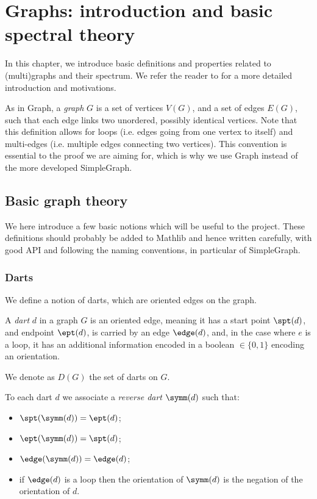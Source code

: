 
\chapter{Graphs: introduction and basic spectral theory}

In this chapter, we introduce basic definitions and properties
related to (multi)graphs and their spectrum.
We refer the reader to \cite{chung1992} for a more detailed introduction and motivations.

As in Graph, a \emph{graph} $G$ is a set of vertices $V(G)$, and
a set of edges $E(G)$, such that each edge links two unordered, possibly identical vertices.
Note that this definition allows for loops (i.e. edges going from one vertex to itself) and
multi-edges (i.e. multiple edges connecting two vertices). This convention is essential to the proof
we are aiming for, which is why we use Graph instead of the more developed
SimpleGraph.

\section{Basic graph theory}

We here introduce a few basic notions which will be useful to the project.
These definitions should probably be added to Mathlib and hence written carefully,
with good API and following the naming conventions, in particular of SimpleGraph.

\subsection{Darts}

We define a notion of darts, which are oriented edges on the graph.


\begin{definition}
  \label{def:dart}
  \leanok
  A \emph{dart} $d$ in a graph $G$ is an oriented edge, meaning it has a start point
  $\spt(d)$, and endpoint $\ept(d)$, is carried by an edge $\edge(d)$, and, in the
  case where $e$ is a loop, it has an additional information encoded in a boolean
  $\in \{0, 1\}$ encoding an orientation.

  We denote as $D(G)$ the set of darts on $G$.
\end{definition}

\begin{definition}
  \label{def:reverse_dart}
  \leanok
  To each dart $d$ we associate a \emph{reverse dart} $\symm(d)$ such that:
  \begin{itemize}
    \item $\spt(\symm(d)) = \ept(d)$;
    \item $\ept(\symm(d)) = \spt(d)$;
    \item $\edge(\symm(d)) = \edge(d)$;
    \item if $\edge(d)$ is a loop then the orientation of $\symm(d)$ is
    the negation of the orientation of $d$.
  \end{itemize}
\end{definition}

